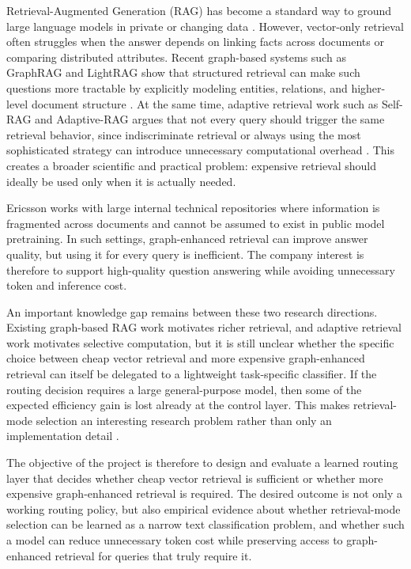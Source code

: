 \documentclass[11pt, a4paper]{article}
\begin{document}
Retrieval-Augmented Generation (RAG) has become a standard way to ground large language models in private or changing data \cite{gao2023ragsurvey}. However, vector-only retrieval often struggles when the answer depends on linking facts across documents or comparing distributed attributes. Recent graph-based systems such as GraphRAG and LightRAG show that structured retrieval can make such questions more tractable by explicitly modeling entities, relations, and higher-level document structure \cite{edge2024graphrag,lightrag2024}. At the same time, adaptive retrieval work such as Self-RAG and Adaptive-RAG argues that not every query should trigger the same retrieval behavior, since indiscriminate retrieval or always using the most sophisticated strategy can introduce unnecessary computational overhead \cite{asai2023selfrag,jeong2024adaptiverag}. This creates a broader scientific and practical problem: expensive retrieval should ideally be used only when it is actually needed.

Ericsson works with large internal technical repositories where information is fragmented across documents and cannot be assumed to exist in public model pretraining. In such settings, graph-enhanced retrieval can improve answer quality, but using it for every query is inefficient. The company interest is therefore to support high-quality question answering while avoiding unnecessary token and inference cost.

An important knowledge gap remains between these two research directions. Existing graph-based RAG work motivates richer retrieval, and adaptive retrieval work motivates selective computation, but it is still unclear whether the specific choice between cheap vector retrieval and more expensive graph-enhanced retrieval can itself be delegated to a lightweight task-specific classifier. If the routing decision requires a large general-purpose model, then some of the expected efficiency gain is lost already at the control layer. This makes retrieval-mode selection an interesting research problem rather than only an implementation detail \cite{hu2024routerbench,benayas2024encoder}.

The objective of the project is therefore to design and evaluate a learned routing layer that decides whether cheap vector retrieval is sufficient or whether more expensive graph-enhanced retrieval is required. The desired outcome is not only a working routing policy, but also empirical evidence about whether retrieval-mode selection can be learned as a narrow text classification problem, and whether such a model can reduce unnecessary token cost while preserving access to graph-enhanced retrieval for queries that truly require it.
\end{document}
